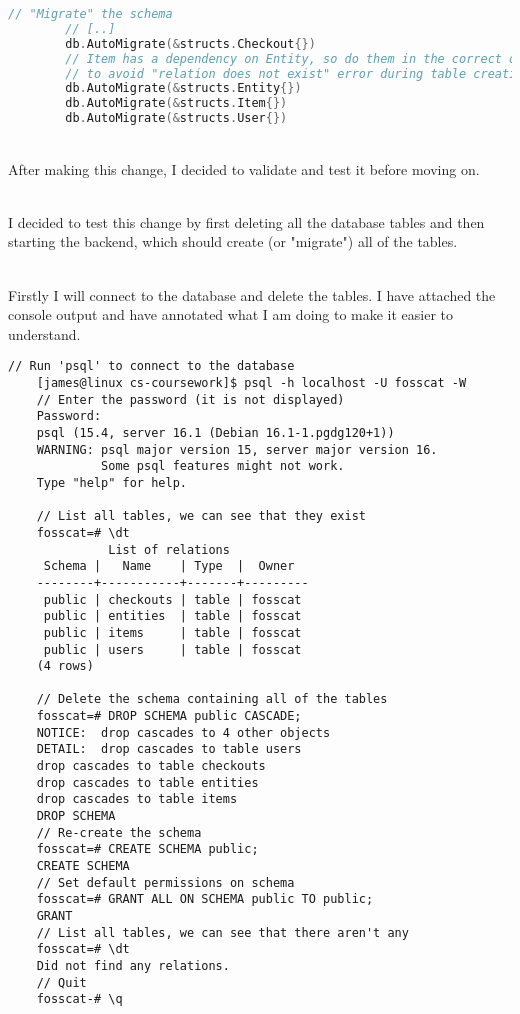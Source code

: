 \documentclass[../../main.tex]{subfiles}
\begin{document}
\begin{lstlisting}[language=Go]
        // "Migrate" the schema
        // [..]
        db.AutoMigrate(&structs.Checkout{})
        // Item has a dependency on Entity, so do them in the correct order
        // to avoid "relation does not exist" error during table creation.
        db.AutoMigrate(&structs.Entity{})
        db.AutoMigrate(&structs.Item{})
        db.AutoMigrate(&structs.User{})
    \end{lstlisting}

\noindent \\ After making this change, I decided to validate and test it before moving on.

\noindent \\ I decided to test this change by first deleting all the database tables and then starting the backend, which should create (or "migrate") all of the tables.

\noindent \\ Firstly I will connect to the database and delete the tables. I have attached the console output and have annotated what I am doing to make it easier to understand.


\begin{lstlisting}[language=custom_psql_commented]
    // Run 'psql' to connect to the database
    [james@linux cs-coursework]$ psql -h localhost -U fosscat -W
    // Enter the password (it is not displayed)
    Password: 
    psql (15.4, server 16.1 (Debian 16.1-1.pgdg120+1))
    WARNING: psql major version 15, server major version 16.
             Some psql features might not work.
    Type "help" for help.
    
    // List all tables, we can see that they exist
    fosscat=# \dt
              List of relations
     Schema |   Name    | Type  |  Owner  
    --------+-----------+-------+---------
     public | checkouts | table | fosscat
     public | entities  | table | fosscat
     public | items     | table | fosscat
     public | users     | table | fosscat
    (4 rows)
    
    // Delete the schema containing all of the tables
    fosscat=# DROP SCHEMA public CASCADE;
    NOTICE:  drop cascades to 4 other objects
    DETAIL:  drop cascades to table users
    drop cascades to table checkouts
    drop cascades to table entities
    drop cascades to table items
    DROP SCHEMA
    // Re-create the schema
    fosscat=# CREATE SCHEMA public;
    CREATE SCHEMA
    // Set default permissions on schema
    fosscat=# GRANT ALL ON SCHEMA public TO public;
    GRANT
    // List all tables, we can see that there aren't any
    fosscat=# \dt
    Did not find any relations.
    // Quit
    fosscat-# \q
    \end{lstlisting}
\end{document}

